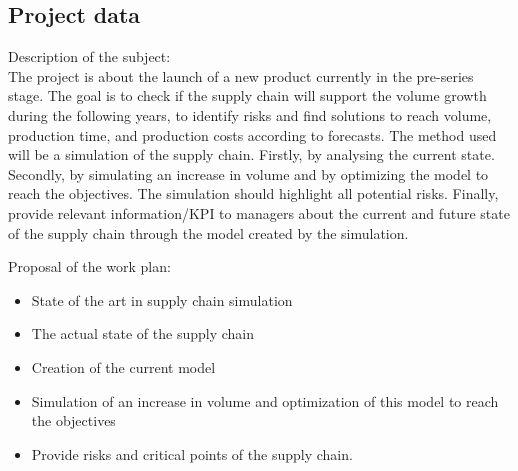 
\subsection*{Project data}

Description of the subject: 
\\
The project is about the launch of a new product currently in the pre-series stage. The goal is to check if the supply chain will support the volume growth during the following years, to identify risks and find solutions to reach volume, production time, and production costs according to forecasts. The method used will be a simulation of the supply chain. Firstly, by analysing the current state. Secondly, by simulating an increase in volume and by optimizing the model to reach the objectives. The simulation should highlight all potential risks. Finally, provide relevant information/KPI to managers about the current and future state of the supply chain through the model created by the simulation.
 
Proposal of the work plan:
\begin{itemize}
    \item State of the art in supply chain simulation
    \item The actual state of the supply chain
    \item Creation of the current model 
    \item Simulation of an increase in volume and optimization of this model to reach the objectives
    \item Provide risks and critical points of the supply chain.
\end{itemize}

